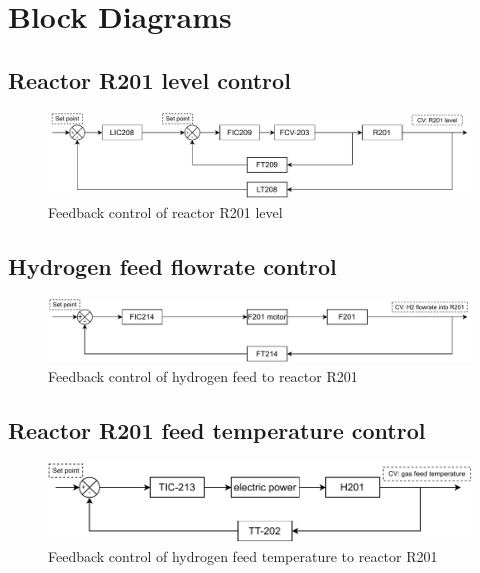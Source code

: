 \section{Block Diagrams}
\label{app:blockdiag}
\subsection{Reactor R201 level control}

    \begin{figure}[H]
        \centering
        \includegraphics[width=0.9\linewidth]{chapters/4-operation-control/4-Figures/R201-LC.pdf}
        \caption{Feedback control of reactor R201 level}
        \label{fig:R201-LC}
    \end{figure} 

\subsection{Hydrogen feed flowrate control}

    \begin{figure}[H]
        \centering
        \includegraphics[width=0.9\linewidth]{chapters/4-operation-control/4-Figures/R201-HFC.pdf}
        \caption{Feedback control of hydrogen feed to reactor R201}
        \label{fig:R201-HFC}
    \end{figure} 

\subsection{Reactor R201 feed temperature control}

    \begin{figure}[H]
        \centering
        \includegraphics[width=0.9\linewidth]{chapters/4-operation-control/4-Figures/H201-TC.pdf}
        \caption{Feedback control of hydrogen feed temperature to reactor R201}
        \label{fig:H201-TC}
    \end{figure} 

